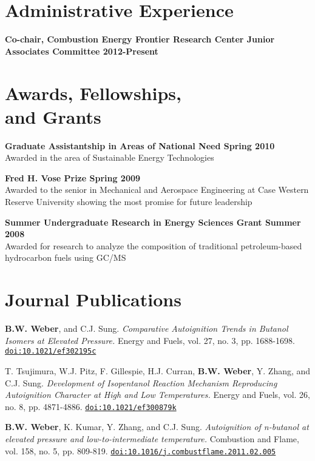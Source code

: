 \documentclass[margin,line]{res}
\newcommand*{\doi}[1]{\href{http://dx.doi.org/#1}{\nolinkurl{doi:#1}}}
\newenvironment{list3}{
  \begin{list}{\ding{113}}{%
      \setlength{\itemsep}{0.1in}
      \setlength{\parsep}{0in} \setlength{\parskip}{0in}
      \setlength{\topsep}{0in} \setlength{\partopsep}{0in} 
      \setlength{\leftmargin}{0in}}}{\end{list}}
\begin{document}
\begin{resume}
\section{\sc Administrative Experience}
{\bf Co-chair, Combustion Energy Frontier Research Center Junior Associates Committee \hfill 2012-Present}

\section{\sc Awards, Fellowships,\\ and Grants}
{\bf Graduate Assistantship in Areas of National Need \hfill Spring 2010}\\
Awarded in the area of Sustainable Energy Technologies

{\bf Fred H. Vose Prize \hfill Spring 2009}\\
Awarded to the senior in Mechanical and Aerospace Engineering at Case Western Reserve University showing the most promise for future leadership

{\bf Summer Undergraduate Research in Energy Sciences Grant \hfill Summer 2008}\\
Awarded for research to analyze the composition of traditional petroleum-based hydrocarbon fuels using GC/MS

\section{\sc Journal Publications}
\begin{list3}
\item[] {\bf B.W. Weber}, and C.J. Sung. {\em Comparative Autoignition Trends in Butanol Isomers at Elevated Pressure.} Energy and Fuels, vol. 27, no. 3, pp. 1688-1698. \doi{10.1021/ef302195c}
\item[] T. Tsujimura, W.J. Pitz, F. Gillespie, H.J. Curran, {\bf B.W. Weber}, Y. Zhang, and C.J. Sung. {\em Development of Isopentanol Reaction Mechanism Reproducing Autoignition Character at High and Low Temperatures.} Energy and Fuels, vol. 26, no. 8, pp. 4871-4886. \doi{10.1021/ef300879k}
\item[] {\bf B.W. Weber}, K. Kumar, Y. Zhang, and C.J. Sung. {\em Autoignition of n-butanol at elevated pressure and low-to-intermediate temperature.} Combustion and Flame, vol. 158, no. 5, pp. 809-819. \doi{10.1016/j.combustflame.2011.02.005}
\end{list3}


\end{resume}
\end{document}
